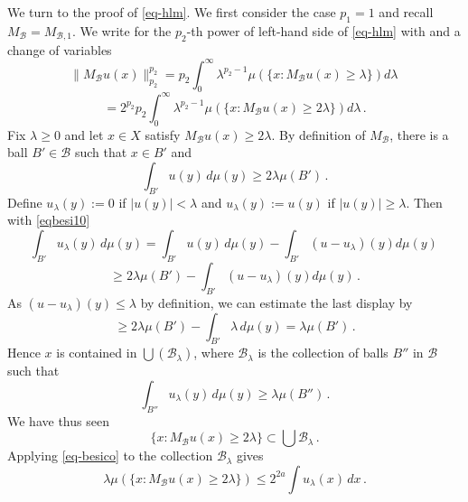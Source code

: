 We turn to the proof of \eqref{eq-hlm}. We first consider the case $p_1=1$ and recall $M_{\mathcal{B}}=M_{\mathcal{B},1}$.
We write for the $p_2$-th power of left-hand side of \eqref{eq-hlm}
with 
and a change of variables
\begin{equation}
    \|M_{\mathcal{B}}u(x)\|_{p_2}^{p_2}
   =p_2\int _0^{\infty}
    \lambda^{p_2-1} \mu(\{x: M_{\mathcal{B}}u(x)\ge \lambda\}) d\lambda\,
\end{equation}
\begin{equation} \label{eqbesi11}
   =2^{p_2} p_2\int _0^{\infty}
    \lambda^{p_2-1} \mu(\{x: M_{\mathcal{B}}u(x)\ge 2\lambda\}) d\lambda\, .
\end{equation}
Fix $\lambda\ge 0$ and let $x\in X$ satisfy $M_{\mathcal{B}}u(x)\ge 2\lambda$. By definition of $M_{\mathcal{B}}$, there is a ball
$B'\in \mathcal{B}$ such that
$x\in B'$ and
\begin{equation}\label{eqbesi10}
\int_{B'} u(y)\, d\mu(y)\ge 2\lambda \mu({B'}) \, .
\end{equation}
Define
$u_\lambda(y):=0$ if $|u(y)|<\lambda$ and $u_\lambda(y):=u(y)$ if $|u(y)|\ge \lambda$.
Then with \eqref{eqbesi10}
\begin{equation}
\int_{B'} u_\lambda (y)\, d\mu(y)
=\int_{B'} u (y)\, d\mu(y)-
\int_{B'} (u-u_\lambda) (y) d\mu(y)\,
\end{equation}
\begin{equation}
\ge 2\lambda \mu({B'})-
\int_{B'} (u-u_\lambda) (y) d\mu(y)\, .
\end{equation}
As $(u-u_\lambda)(y)\le \lambda$
by definition, we can estimate the last display by
\begin{equation}
\ge 2\lambda \mu({B'})-
\int_{B'} \lambda \, d\mu(y)
=\lambda \mu({B'})\, .
\end{equation}
Hence $x$ is contained in
$\bigcup(\mathcal{B}_\lambda)$,
where $\mathcal{B}_\lambda$
is the collection of balls $B''$ in $\mathcal{B}$ such that
\begin{equation}
    \int_{B''} u_\lambda (y)\, d\mu(y)\ge \lambda \mu(B'')\, .
\end{equation}
We have thus seen
\begin{equation}
    \{x: M_{\mathcal{B}}u(x)\ge 2\lambda\}\subset
    \bigcup \mathcal{B}_\lambda
\, .
\end{equation}
Applying \eqref{eq-besico} to the collection $\mathcal{B}_\lambda$
gives
\begin{equation}
    \lambda \mu(\{x: M_{\mathcal{B}}u(x)\ge 2\lambda\})\le
   2^{2a}
    \int u_\lambda (x)\, dx\, .
\end{equation}
